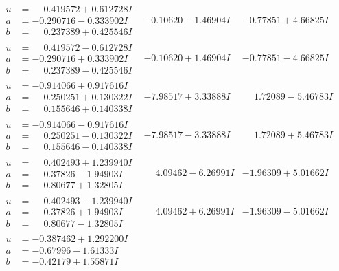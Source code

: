 \documentclass[1p]{elsarticle_modified}
\theoremstyle{definition}
\begin{document}
$$\begin{array}{c|c|c}
\begin{aligned}
u &= \phantom{-}0.419572 + 0.612728 I \\
a &= -0.290716 - 0.333902 I \\
b &= \phantom{-}0.237389 + 0.425546 I\end{aligned}
 & -0.10620 - 1.46904 I & -0.77851 + 4.66825 I \\ \hline\begin{aligned}
u &= \phantom{-}0.419572 - 0.612728 I \\
a &= -0.290716 + 0.333902 I \\
b &= \phantom{-}0.237389 - 0.425546 I\end{aligned}
 & -0.10620 + 1.46904 I & -0.77851 - 4.66825 I \\ \hline\begin{aligned}
u &= -0.914066 + 0.917616 I \\
a &= \phantom{-}0.250251 + 0.130322 I \\
b &= \phantom{-}0.155646 + 0.140338 I\end{aligned}
 & -7.98517 + 3.33888 I & \phantom{-}1.72089 - 5.46783 I \\ \hline\begin{aligned}
u &= -0.914066 - 0.917616 I \\
a &= \phantom{-}0.250251 - 0.130322 I \\
b &= \phantom{-}0.155646 - 0.140338 I\end{aligned}
 & -7.98517 - 3.33888 I & \phantom{-}1.72089 + 5.46783 I \\ \hline\begin{aligned}
u &= \phantom{-}0.402493 + 1.239940 I \\
a &= \phantom{-}0.37826 - 1.94903 I \\
b &= \phantom{-}0.80677 + 1.32805 I\end{aligned}
 & \phantom{-}4.09462 - 6.26991 I & -1.96309 + 5.01662 I \\ \hline\begin{aligned}
u &= \phantom{-}0.402493 - 1.239940 I \\
a &= \phantom{-}0.37826 + 1.94903 I \\
b &= \phantom{-}0.80677 - 1.32805 I\end{aligned}
 & \phantom{-}4.09462 + 6.26991 I & -1.96309 - 5.01662 I \\ \hline\begin{aligned}
u &= -0.387462 + 1.292200 I \\
a &= -0.67996 - 1.61333 I \\
b &= -0.42179 + 1.55871 I\end{aligned}

\end{array}$$
\end{document}
